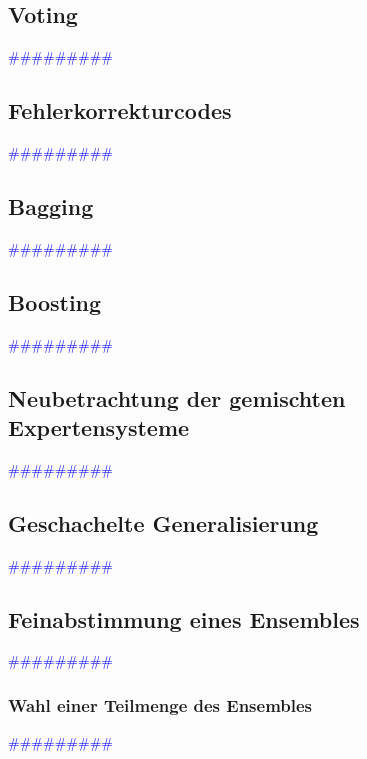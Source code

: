 \documentclass{article}
\begin{document}
  \subsection{Voting} %
      \textcolor{blue}{\#\#\#\#\#\#\#\#\#}
  \subsection{Fehlerkorrekturcodes} %
      \textcolor{blue}{\#\#\#\#\#\#\#\#\#}
  \subsection{Bagging} %
      \textcolor{blue}{\#\#\#\#\#\#\#\#\#}
  \subsection{Boosting} %
      \textcolor{blue}{\#\#\#\#\#\#\#\#\#}
  \subsection{Neubetrachtung der gemischten Expertensysteme} %
      \textcolor{blue}{\#\#\#\#\#\#\#\#\#}
  \subsection{Geschachelte Generalisierung} %
      \textcolor{blue}{\#\#\#\#\#\#\#\#\#}
  \subsection{Feinabstimmung eines Ensembles} %
      \textcolor{blue}{\#\#\#\#\#\#\#\#\#}
    \subsubsection{Wahl einer Teilmenge des Ensembles} %
      \textcolor{blue}{\#\#\#\#\#\#\#\#\#}
\end{document}
